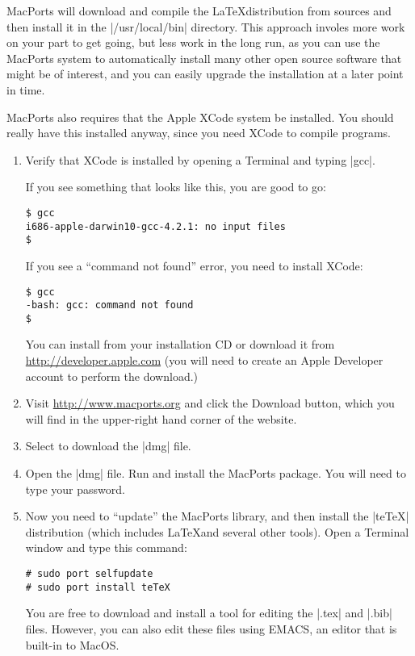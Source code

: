 MacPorts will download and compile the \LaTeX distribution from
sources and then install it in the |/usr/local/bin| directory. This
approach involes more work on your part to get going, but less work in
the long run, as you can use the MacPorts system to automatically
install many other open source software that might be of interest, and you
can easily upgrade the installation at a later point in time.

MacPorts also requires that the Apple XCode system be installed. You should
really have this installed anyway, since you need XCode to compile
programs. 

\begin{enumerate}
\item Verify that XCode is installed by opening a Terminal and typing
  |gcc|. 

If you see something that looks like this, you are good to go:
\begin{Verbatim}
$ gcc
i686-apple-darwin10-gcc-4.2.1: no input files
$ 
\end{Verbatim}

If you see a ``command not found'' error, you need to install XCode:
\begin{Verbatim}
$ gcc
-bash: gcc: command not found
$ 
\end{Verbatim}

You can install from your installation CD or download it
from \url{http://developer.apple.com} (you will need to create an
Apple Developer account to perform the download.)

\item Visit \url{http://www.macports.org} and click the Download
  button, which you will find in the upper-right hand corner of the
  website.
\item Select to download the |dmg| file.
\item Open the |dmg| file. Run and install the MacPorts package. You
  will need to type your password.
\item Now you need to ``update'' the MacPorts library, and then
  install the |teTeX| distribution (which includes \LaTeX and several
  other tools). Open a Terminal window and type this command:
\begin{Verbatim}
# sudo port selfupdate
# sudo port install teTeX
\end{Verbatim}

You are free to download and install a tool for editing the |.tex| and
|.bib| files. However, you can also edit these files using EMACS, an
editor that is built-in to MacOS. 


\end{enumerate}

